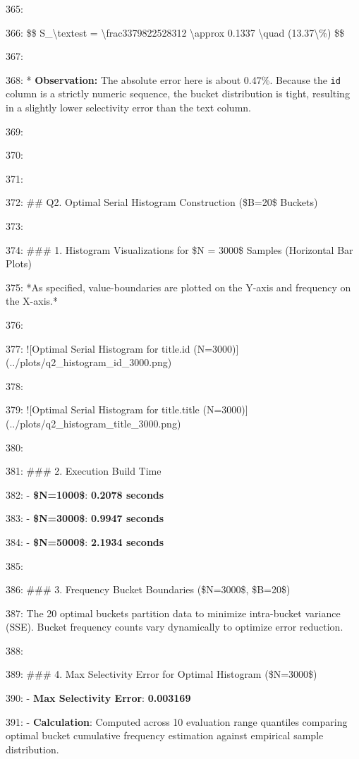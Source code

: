 \documentclass[11pt,a4paper]{article}
\begin{document}
{365:

366:     \$\$ S\_{\textbackslash{}text{est}} = \textbackslash{}frac{337982}{2528312} \textbackslash{}approx 0.1337 \textbackslash{}quad (13.37\textbackslash{}\%) \$\$

367:

368: *   \textbf{Observation:} The absolute error here is about 0.47\%. Because the \texttt{id} column is a strictly numeric sequence, the bucket distribution is tight, resulting in a slightly lower selectivity error than the text column.

369:

370:

371:

372: \#\# Q2. Optimal Serial Histogram Construction (\$B=20\$ Buckets)

373:

374: \#\#\# 1. Histogram Visualizations for \$N = 3000\$ Samples (Horizontal Bar Plots)

375: *As specified, value-boundaries are plotted on the Y-axis and frequency on the X-axis.*

376:

377: ![Optimal Serial Histogram for title.id (N=3000)](../plots/q2\_histogram\_id\_3000.png)

378:

379: ![Optimal Serial Histogram for title.title (N=3000)](../plots/q2\_histogram\_title\_3000.png)

380:

381: \#\#\# 2. Execution Build Time

382: - \textbf{\$N=1000\$}: \textbf{0.2078 seconds}

383: - \textbf{\$N=3000\$}: \textbf{0.9947 seconds}

384: - \textbf{\$N=5000\$}: \textbf{2.1934 seconds}

385:

386: \#\#\# 3. Frequency Bucket Boundaries (\$N=3000\$, \$B=20\$)

387: The 20 optimal buckets partition data to minimize intra-bucket variance (SSE). Bucket frequency counts vary dynamically to optimize error reduction.

388:

389: \#\#\# 4. Max Selectivity Error for Optimal Histogram (\$N=3000\$)

390: - \textbf{Max Selectivity Error}: \textbf{0.003169}

391: - \textbf{Calculation}: Computed across 10 evaluation range quantiles comparing optimal bucket cumulative frequency estimation against empirical sample distribution.

}
\end{document}
